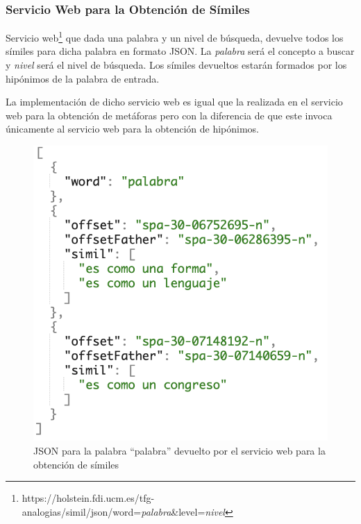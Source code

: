 \subsubsection{Servicio Web para la Obtención de Símiles}
\label{cap:subsec:sw_simil}
Servicio web\footnote{https://holstein.fdi.ucm.es/tfg-analogias/simil/json/word=\textit{palabra}\&level=\textit{nivel}} que dada una palabra y un nivel de búsqueda, devuelve todos los símiles para dicha palabra en formato JSON. La \textit{palabra} será el concepto a buscar y \textit{nivel} será el nivel de búsqueda.
Los símiles devueltos estarán formados por los hipónimos de la palabra de entrada.

La implementación de dicho servicio web es igual que la realizada en el servicio web para la obtención de metáforas pero con la diferencia de que este invoca únicamente al servicio web para la obtención de hipónimos.


\begin{figure}[!h]
	\includegraphics[width=.6\textwidth]{Imagenes/Bitmap/Capitulo4/JSON-SW/peticionSimil.png}
	\centering
	\caption{JSON para la palabra ``palabra'' devuelto por el servicio web para la obtención de símiles}
	\label{fig:peticionSimil}
\end{figure}

